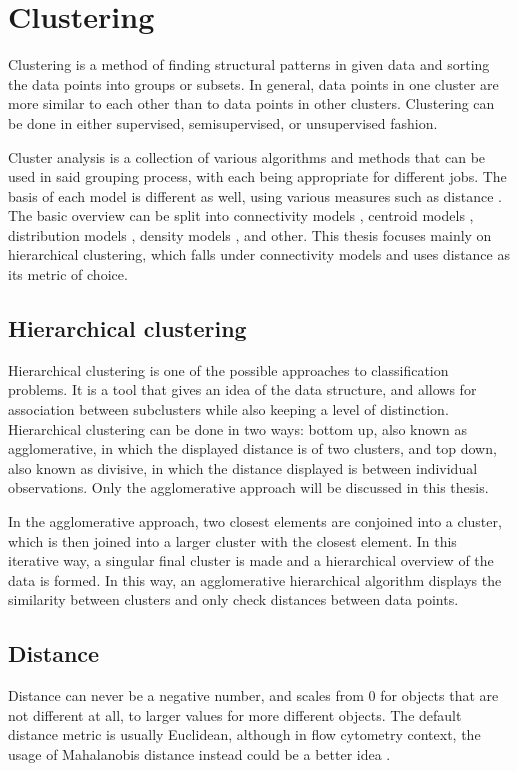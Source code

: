 \chapter{Clustering}
\label{chap:clustering}
Clustering is a method of finding structural patterns in given data and sorting the data points into groups or subsets. In general, data points in one cluster are more similar to each other than to data points in other clusters. Clustering can be done in either supervised, semisupervised, or unsupervised fashion. 

Cluster analysis is a collection of various algorithms and methods that can be used in said grouping process, with each being appropriate for different jobs. The basis of each model is different as well, using various measures such as distance \citep{murtagh2017algorithms, hsu2007hierarchical}. The basic overview can be split into connectivity models \citep{fischer2003clustering}, centroid models \citep{morissette2013k, sun2014parallel}, distribution models \citep{jimenez2019extensions, bocchieri2001subspace}, density models \citep{campello2020density}, and other. This thesis focuses mainly on hierarchical clustering, which falls under connectivity models and uses distance as its metric of choice. 

\section{Hierarchical clustering}
\label{sec:hierarchicalclustering}
Hierarchical clustering is one of the possible approaches to classification problems. It is a tool that gives an idea of the data structure, and allows for association between subclusters while also keeping a level of distinction. Hierarchical clustering can be done in two ways: bottom up, also known as agglomerative, in which the displayed distance is of two clusters, and top down, also known as divisive, in which the distance displayed is between individual observations. Only the agglomerative approach will be discussed in this thesis. 

In the agglomerative approach, two closest elements are conjoined into a cluster, which is then joined into a larger cluster with the closest element. In this iterative way, a singular final cluster is made and a hierarchical overview of the data is formed. In this way, an agglomerative hierarchical algorithm displays the similarity between clusters and only check distances between data points.

\section{Distance}
\label{sec:distance}
Distance can never be a negative number, and scales from 0 for objects that are not different at all, to larger values for more different objects. The default distance metric is usually Euclidean, although in flow cytometry context, the usage of Mahalanobis distance instead could be a better idea \cite{fivser2012detection}.

